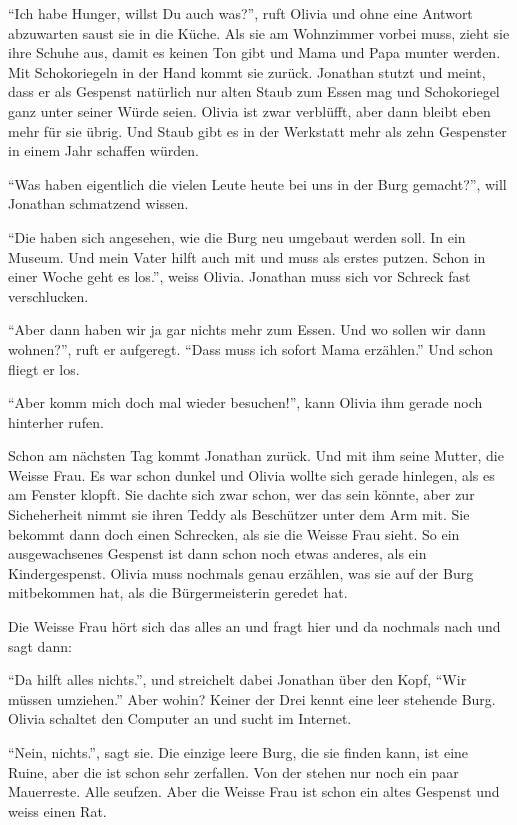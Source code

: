 \enquote{Ich habe Hunger, willst Du auch was?}, ruft Olivia und ohne eine Antwort abzuwarten saust sie in die Küche. Als sie am Wohnzimmer vorbei muss, zieht sie ihre Schuhe aus, damit es keinen Ton gibt und Mama und Papa munter werden. Mit Schokoriegeln in der Hand kommt sie zurück. Jonathan stutzt und meint, dass er als Gespenst natürlich nur alten Staub zum Essen mag und Schokoriegel ganz unter seiner Würde seien. Olivia ist zwar verblüfft, aber dann bleibt eben mehr für sie übrig. Und Staub gibt es in der Werkstatt mehr als zehn Gespenster in einem Jahr schaffen würden.

\enquote{Was haben eigentlich die vielen Leute heute bei uns in der Burg gemacht?}, will Jonathan schmatzend wissen.

\enquote{Die haben sich angesehen, wie die Burg neu umgebaut werden soll. In ein Museum. Und mein Vater hilft auch mit und muss als erstes putzen. Schon in einer Woche geht es los.}, weiss Olivia. Jonathan muss sich vor Schreck fast verschlucken.

\enquote{Aber dann haben wir ja gar nichts mehr zum Essen. Und wo sollen wir dann wohnen?}, ruft er aufgeregt. \enquote{Dass muss ich sofort Mama erzählen.} Und schon fliegt er los.

\enquote{Aber komm mich doch mal wieder besuchen!}, kann Olivia ihm gerade noch hinterher rufen.

Schon am nächsten Tag kommt Jonathan zurück. Und mit ihm seine Mutter, die Weisse Frau. Es war schon dunkel und Olivia wollte sich gerade hinlegen, als es am Fenster klopft. Sie dachte sich zwar schon, wer das sein könnte, aber zur Sicheherheit nimmt sie ihren Teddy als Beschützer unter dem Arm mit. Sie bekommt dann doch einen Schrecken, als sie die Weisse Frau sieht. So ein ausgewachsenes Gespenst ist dann schon noch etwas anderes, als ein Kindergespenst. Olivia muss nochmals genau erzählen, was sie auf der Burg mitbekommen hat, als die Bürgermeisterin geredet hat.

Die Weisse Frau hört sich das alles an und fragt hier und da nochmals nach und sagt dann: 

\enquote{Da hilft alles nichts.}, und streichelt dabei Jonathan über den Kopf, \enquote{Wir müssen umziehen.} Aber wohin? Keiner der Drei kennt eine leer stehende Burg. Olivia schaltet den Computer an und sucht im Internet.

\enquote{Nein, nichts.}, sagt sie. Die einzige leere Burg, die sie finden kann, ist eine Ruine, aber die ist schon sehr zerfallen. Von der stehen nur noch ein paar Mauerreste. Alle seufzen. Aber die Weisse Frau ist schon ein altes Gespenst und weiss einen Rat.


